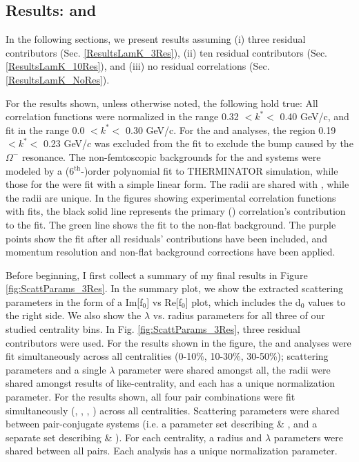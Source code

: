 \documentclass[/home/jesse/Analysis/FemtoAnalysis/AnalysisNotes/AnalysisNoteJBuxton.tex]{subfiles}
\begin{document}
\subsection{Results: \LamKs and \LamKpm}
\label{ResultsLamK}

In the following sections, we present results assuming (i) three residual contributors (Sec. \ref{ResultsLamK_3Res}), (ii) ten residual contributors (Sec. \ref{ResultsLamK_10Res}), and (iii) no residual correlations (Sec. \ref{ResultsLamK_NoRes}).

For the results shown, unless otherwise noted, the following hold true:
All correlation functions were normalized in the range 0.32 $< k^{*} <$ 0.40 GeV/c, and fit in the range 0.0 $< k^{*} <$ 0.30 GeV/c.
For the \LamKchM and \ALamKchP analyses, the region 0.19 $< k^{*} <$ 0.23 GeV/$c$ was excluded from the fit to exclude the bump caused by the $\Omega^{-}$ resonance.
The non-femtoscopic backgrounds for the \LamKchP and \LamKchM systems were modeled by a (6$^{\mathrm{th}}$-)order polynomial fit to THERMINATOR simulation, while those for the \LamKs were fit with a simple linear form.
The \LamKchPALamKchM radii are shared with \LamKchMALamKchP, while the \LamKsALamKs radii are unique.
In the figures showing experimental correlation functions with fits, the black solid line represents the primary (\LamK) correlation's contribution to the fit.
The green line shows the fit to the non-flat background.  
The purple points show the fit after all residuals' contributions have been included, and momentum resolution and non-flat background corrections have been applied.


Before beginning, I first collect a summary of my final results in Figure \ref{fig:ScattParams_3Res}.  
In the summary plot, we show the extracted scattering parameters in the form of a Im[f$_{0}$] vs Re[f$_{0}$] plot, which includes the d$_{0}$ values to the right side.  
We also show the $\lambda$ vs. radius parameters for all three of our studied centrality bins.  
In Fig. \ref{fig:ScattParams_3Res}, three residual contributors were used.
For the \LamKs results shown in the figure, the \LamKs and \ALamKs analyses were fit simultaneously across all centralities (0-10\%, 10-30\%, 30-50\%); scattering parameters and a single $\lambda$ parameter were shared amongst all, the radii were shared amongst results of like-centrality, and each has a unique normalization parameter.  
For the \LamKpm results shown, all four pair combinations were fit simultaneously (\LamKchP, \ALamKchM, \LamKchM, \ALamKchP) across all centralities.  
Scattering parameters were shared between pair-conjugate systems (i.e. a parameter set describing \LamKchP \& \ALamKchM, and a separate set describing \LamKchM \& \ALamKchP).  
For each centrality, a radius and $\lambda$ parameters were shared between all pairs.  Each analysis has a unique normalization parameter.
\end{document}
